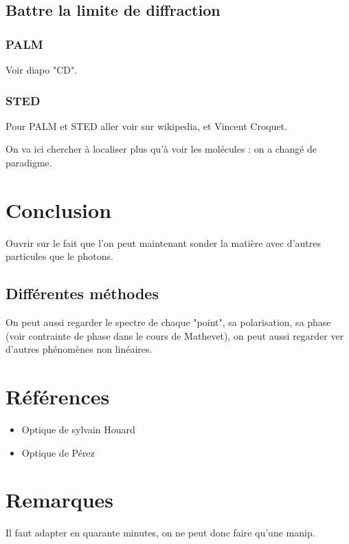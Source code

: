 \documentclass[12pt,prb,aps,epsf]{article}
\begin{document}
\subsection{Battre la limite de diffraction}
\subsubsection{PALM}
Voir diapo "CD".

\subsubsection{STED}
Pour PALM et STED aller voir sur wikipedia, et Vincent Croquet.

On va ici chercher à localiser plus qu'à voir les molécules : on a changé de paradigme.

\section{Conclusion}
Ouvrir sur le fait que l'on peut maintenant sonder la matière avec d'autres particules que le photons.

\subsection{Différentes méthodes}
On peut aussi regarder le spectre de chaque "point", sa polarisation, sa phase (voir contrainte de phase dans le cours de Mathevet), on peut aussi regarder ver d'autres phénomènes non linéaires.
\section{Références}
\begin{itemize}
	\item Optique de sylvain Houard
	\item Optique de Pérez
\end{itemize}

\section{Remarques}
Il faut adapter en quarante minutes, on ne peut donc faire qu'une manip.

	
\end{document}
